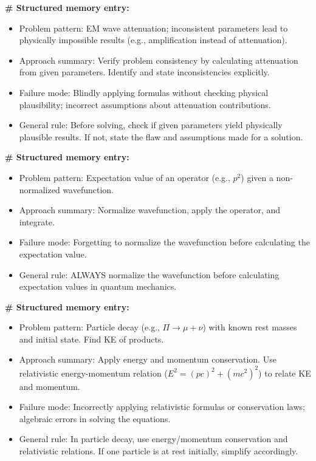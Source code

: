 \documentclass{article} %
\begin{document}
\begin{tcolorbox}[
    colback=gray!5, %
    colframe=gray!75, %
    fonttitle=\bfseries,
    title=Specialist Memory: \textsc{CoT\_Physics},
    arc=2mm, %
    boxrule=1pt,
    breakable
]
\textbf{\# Structured memory entry:}
\begin{itemize}
    \itemsep0.5em
    \item Problem pattern: EM wave attenuation; inconsistent parameters lead to physically impossible results (e.g., amplification instead of attenuation).
    \item Approach summary: Verify problem consistency by calculating attenuation from given parameters. Identify and state inconsistencies explicitly.
    \item Failure mode: Blindly applying formulas without checking physical plausibility; incorrect assumptions about attenuation contributions.
    \item General rule: Before solving, check if given parameters yield physically plausible results. If not, state the flaw and assumptions made for a solution.
\end{itemize}

\vspace{1em}

\textbf{\# Structured memory entry:}
\begin{itemize}
    \itemsep0.5em
    \item Problem pattern: Expectation value of an operator (e.g., \(p^2\)) given a non-normalized wavefunction.
    \item Approach summary: Normalize wavefunction, apply the operator, and integrate.
    \item Failure mode: Forgetting to normalize the wavefunction before calculating the expectation value.
    \item General rule: ALWAYS normalize the wavefunction before calculating expectation values in quantum mechanics.
\end{itemize}

\vspace{1em}

\textbf{\# Structured memory entry:}
\begin{itemize}
    \itemsep0.5em
    \item Problem pattern: Particle decay (e.g., \(\Pi \to \mu + \nu\)) with known rest masses and initial state. Find KE of products.
    \item Approach summary: Apply energy and momentum conservation. Use relativistic energy-momentum relation (\(E^2 = (pc)^2 + (mc^2)^2\)) to relate KE and momentum.
    \item Failure mode: Incorrectly applying relativistic formulas or conservation laws; algebraic errors in solving the equations.
    \item General rule: In particle decay, use energy/momentum conservation and relativistic relations. If one particle is at rest initially, simplify accordingly.
\end{itemize}

\end{tcolorbox}
    
\end{document}
